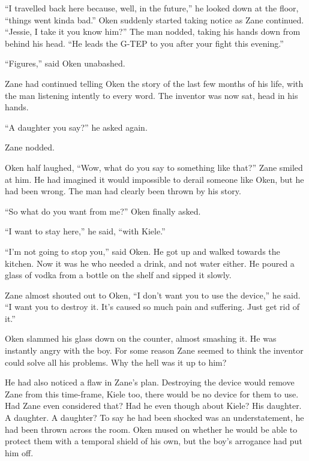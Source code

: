 ``I travelled back here because, well, in the future,'' he looked down at the floor, ``things went kinda bad.''  Oken suddenly started taking notice as Zane continued.  ``Jessie, I take it you know him?''  The man nodded, taking his hands down from behind his head.  ``He leads the G-TEP to you after your fight this evening.''

``Figures,'' said Oken unabashed.  



\thoughtbreak



Zane had continued telling Oken the story of the last few months of his life, with the man listening intently to every word.  The inventor was now sat, head in his hands.

``A daughter you say?'' he asked again.

Zane nodded.

Oken half laughed, ``Wow, what do you say to something like that?''  Zane smiled at him.  He had imagined it would impossible to derail someone like Oken, but he had been wrong.  The man had clearly been thrown by his story.

``So what do you want from me?'' Oken finally asked.

``I want to stay here,'' he said, ``with Kiele.''

``I'm not going to stop you,'' said Oken.  He got up and walked towards the kitchen.  Now it was he who needed a drink, and not water either.  He poured a glass of vodka from a bottle on the shelf and sipped it slowly.  

Zane almost shouted out to Oken, ``I don't want you to use the device,'' he said.  ``I want you to destroy it.  It's caused so much pain and suffering.  Just get rid of it.''

Oken slammed his glass down on the counter, almost smashing it.  He was instantly angry with the boy.  For some reason Zane seemed to think the inventor could solve all his problems.  Why the hell was it up to him?  

He had also noticed a flaw in Zane's plan.  Destroying the device would remove Zane from this time-frame, Kiele too, there would be no device for them to use.  Had Zane even considered that?  Had he even though about Kiele?  His daughter.  A daughter.  A daughter?  To say he had been shocked was an understatement, he had been thrown across the room.  Oken mused on whether he would be able to protect them with a temporal shield of his own, but the boy's arrogance had put him off.


